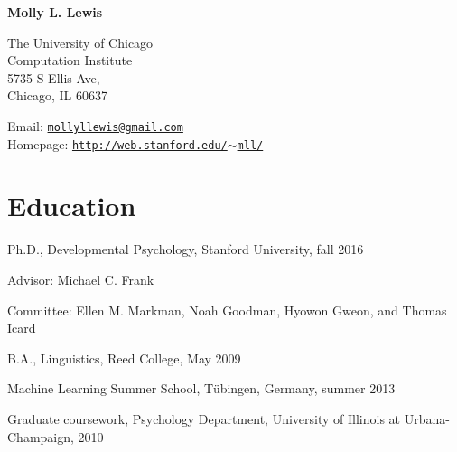 \documentclass[letterpaper]{article}
\def\name{Molly L.  Lewis}
\renewenvironment{itemize}{
  \begin{list}{}{
    \setlength{\leftmargin}{1.5em}
  }
}{
  \end{list}
}
\begin{document}
\centerline{\huge \bf \name}
\vspace{0.25in}


 \normalsize
  
  The University of Chicago  \\
  Computation Institute \\
  5735 S Ellis Ave,\\
 Chicago, IL 60637\\
  
  \begin{minipage}{0.45\linewidth}
Email: \href{mailto:mollyllewis@gmail.com}{\tt mollyllewis@gmail.com}\\
Homepage: \href{http://web.stanford.edu/~mll/}{\tt http://web.stanford.edu/$\sim$mll/}\\
 
\end{minipage}


\section*{Education}

\begin{itemize}
  \item Ph.D., Developmental Psychology, Stanford University, fall 2016
  \begin{itemize}
  	\item Advisor: Michael C. Frank
	\item Committee: Ellen M. Markman, Noah Goodman, Hyowon Gweon, and Thomas Icard
   \end{itemize}
  \item B.A., Linguistics, Reed College, May 2009
   \item Machine Learning Summer School, T\"{u}bingen, Germany, summer 2013 
   \item Graduate coursework, Psychology Department, University of Illinois at Urbana-Champaign, 2010
\end{itemize}
\end{document}
